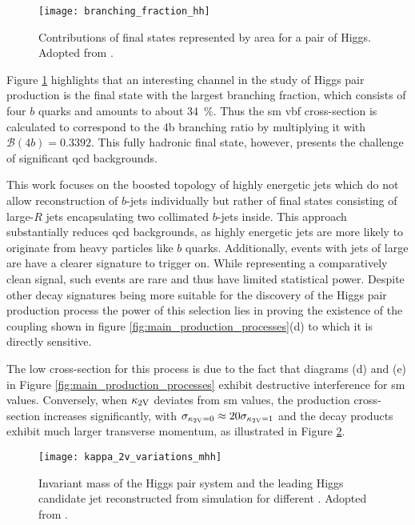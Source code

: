 \begin{figure}
    \centering
    \texttt{[image: branching\_fraction\_hh]}
    \caption[]{Contributions of final states represented by area for a pair of Higgs. Adopted from \citep{ATL-COM-PHYS-2020-083}.}
    \label{fig:branching_fraction_hh}
\end{figure}
Figure \ref{fig:branching_fraction_hh} highlights that an interesting channel in the study of Higgs pair production is the final state with the largest branching fraction, which consists of four $b$ quarks and amounts to about \qty[]{34}{\percent}. Thus the \ac{sm} \ac{vbf} cross-section is calculated to correspond to the 4b branching ratio by multiplying it with $\mathcal{B}(4b)=0.3392$. This fully hadronic final state, however, presents the challenge of significant \ac{qcd} backgrounds.

This work focuses on the boosted topology of highly energetic jets which do not allow reconstruction of $b$-jets individually but rather of final states consisting of large-$R$ jets encapsulating two collimated $b$-jets inside. This approach substantially reduces \ac{qcd} backgrounds, as highly energetic jets are more likely to originate from heavy particles like $b$ quarks. Additionally, events with jets of large \pt are have a clearer signature to trigger on. While representing a comparatively clean signal, such events are rare and thus have limited statistical power. Despite other decay signatures being more suitable for the discovery of the Higgs pair production process the power of this selection lies in proving the existence of the \ktwov coupling shown in figure \ref{fig:main_production_processes}(d) to which it is directly sensitive.

The low cross-section for this process is due to the fact that diagrams (d) and (e) in Figure \ref{fig:main_production_processes} exhibit destructive interference for \ac{sm} values. Conversely, when $\kappa_{\text{2V}}$ deviates from \ac{sm} values, the production cross-section increases significantly, with $\sigma_{\kappa_{\text{2V}}=0}\approx 20\sigma_{\kappa_{\text{2V}}=1}$ and the decay products exhibit much larger transverse momentum, as illustrated in Figure \ref{fig:kappa_2v_variations_mhh}.
\begin{figure}
    \centering
    \texttt{[image: kappa\_2v\_variations\_mhh]}
    \caption[]{Invariant mass of the Higgs pair system and the leading Higgs candidate jet \pt  reconstructed from simulation for different \ktwov. Adopted from \citep{ATL-PHYS-PUB-2019-007}.}
    \label{fig:kappa_2v_variations_mhh}
\end{figure}

